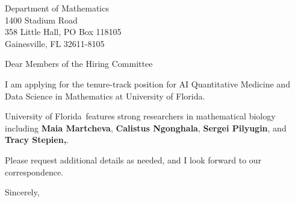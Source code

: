 




	
	
	\def\School{University of Florida}
	
	\begin{letter}
		{Department of Mathematics\\
			1400 Stadium Road\\
			358 Little Hall, PO Box 118105\\
			Gainesville, FL 32611-8105
			
		}
		
		\opening{Dear Members of the Hiring Committee}
		
		
		I am applying for the tenure-track position for AI Quantitative Medicine and Data Science in Mathematics at \School. 
		
		\School~features strong researchers in mathematical biology including \textbf{Maia Martcheva}, \textbf{Calistus Ngonghala}, \textbf{Sergei Pilyugin}, and \textbf{Tracy Stepien,}. 
		
		
		
		
		
		Please request additional details as needed, and I look forward to our correspondence.
		
		\closing{Sincerely,}
	\end{letter}
